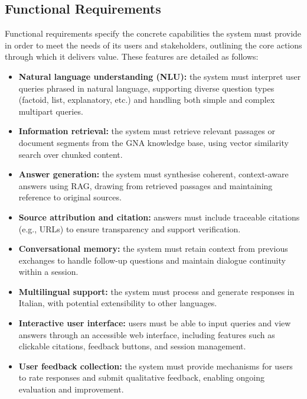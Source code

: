 \begin{spacing}{1.5}
\subsection{Functional Requirements}
Functional requirements specify the concrete capabilities the system must provide in order to meet the needs of its users and stakeholders, outlining the core actions through which it delivers value. These features are detailed as follows:
\begin{itemize}
    \item \textbf{Natural language understanding (NLU):} the system must interpret user queries phrased in natural language, supporting diverse question types (factoid, list, explanatory, etc.) and handling both simple and complex multipart queries.
    \item \textbf{Information retrieval:} the system must retrieve relevant passages or document segments from the GNA knowledge base, using vector similarity search over chunked content.
    \item \textbf{Answer generation:} the system must synthesise coherent, context-aware answers using RAG, drawing from retrieved passages and maintaining reference to original sources.
    \item \textbf{Source attribution and citation:} answers must include traceable citations (e.g., URLs) to ensure transparency and support verification.
    \item \textbf{Conversational memory:} the system must retain context from previous exchanges to handle follow-up questions and maintain dialogue continuity within a session.
    \item \textbf{Multilingual support:} the system must process and generate responses in Italian, with potential extensibility to other languages.
    \item \textbf{Interactive user interface:} users must be able to input queries and view answers through an accessible web interface, including features such as clickable citations, feedback buttons, and session management.
    \item \textbf{User feedback collection:} the system must provide mechanisms for users to rate responses and submit qualitative feedback, enabling ongoing evaluation and improvement.
\end{itemize}


\end{spacing}
